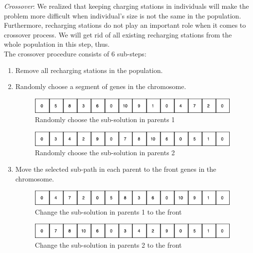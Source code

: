 \documentclass[conference,compsoc]{IEEEtran}
\begin{document}
\textit{Crossover}: We realized that keeping charging stations in individuals will make the problem more difficult when individual's size is not the same in the population. Furthermore, recharging stations do not play an important role when it comes to crossover process. We will get rid of all existing recharging stations from the whole population in this step, thus.\\
The crossover procedure consists of 6 sub-steps:
\begin{enumerate}
    \item Remove all recharging stations in the population.
    
    \item Randomly choose a segment of genes in the chromosome.
    \begin{figure}[h!]
    \centering
    \includegraphics[scale=0.42]{2}
    \caption{Randomly choose the sub-solution in parents 1}
    \label{fig:my_label}
\end{figure}

    \begin{figure}[h!]
    \centering
    \includegraphics[scale=0.42]{3}
    \caption{Randomly choose the sub-solution in parents 2}
    \label{fig:my_label}
\end{figure}

    \item Move the selected sub-path in each parent to the front genes in the chromosome.
    
    \begin{figure}[h!]
    \centering
    \includegraphics[scale=0.42]{4}
    \caption{Change the sub-solution in parents 1 to the front}
    \label{fig:my_label}
\end{figure}

    \begin{figure}[h!]
    \centering
    \includegraphics[scale=0.42]{5}
    \caption{Change the sub-solution in parents 2 to the front}
    \label{fig:my_label}
\end{figure}



\end{enumerate}
\end{document}
